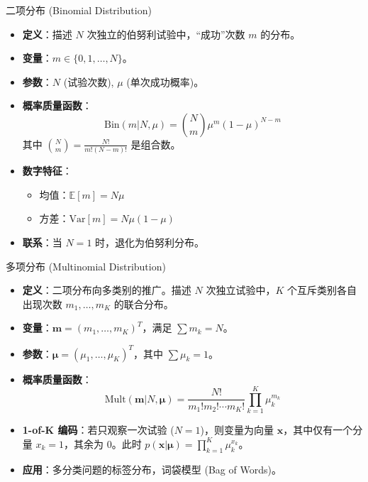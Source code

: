 \documentclass[12pt, aspectratio=169]{beamer}
\newcommand{\vect}[1]{\mathbf{#1}}
\newcommand{\E}{\mathbb{E}}
\begin{document}
\begin{frame}{二项分布 (Binomial Distribution)}
    \begin{itemize}
        \item \textbf{定义}：描述 $N$ 次独立的伯努利试验中，“成功”次数 $m$ 的分布。
        \item \textbf{变量}：$m \in \{0, 1, \dots, N\}$。
        \item \textbf{参数}：$N$ (试验次数), $\mu$ (单次成功概率)。
        \item \textbf{概率质量函数}：
        $$ \text{Bin}(m|N, \mu) = \binom{N}{m} \mu^m (1-\mu)^{N-m} $$
        其中 $\binom{N}{m} = \frac{N!}{m!(N-m)!}$ 是组合数。
        \item \textbf{数字特征}：
        \begin{itemize}
            \item 均值：$\E[m] = N\mu$
            \item 方差：$\text{Var}[m] = N\mu(1-\mu)$
        \end{itemize}
        \item \textbf{联系}：当 $N=1$ 时，退化为伯努利分布。
    \end{itemize}
\end{frame}

\begin{frame}{多项分布 (Multinomial Distribution)}
    \begin{itemize}
        \item \textbf{定义}：二项分布向多类别的推广。描述 $N$ 次独立试验中，$K$ 个互斥类别各自出现次数 $m_1, \dots, m_K$ 的联合分布。
        \item \textbf{变量}：$\vect{m} = (m_1, \dots, m_K)^T$，满足 $\sum m_k = N$。
        \item \textbf{参数}：$\boldsymbol{\mu} = (\mu_1, \dots, \mu_K)^T$，其中 $\sum \mu_k = 1$。
        \item \textbf{概率质量函数}：
        $$ \text{Mult}(\vect{m}|N, \boldsymbol{\mu}) = \frac{N!}{m_1! m_2! \cdots m_K!} \prod_{k=1}^K \mu_k^{m_k} $$
        \item \textbf{1-of-K 编码}：若只观察一次试验 ($N=1$)，则变量为向量 $\vect{x}$，其中仅有一个分量 $x_k=1$，其余为 0。此时 $p(\vect{x}|\boldsymbol{\mu}) = \prod_{k=1}^K \mu_k^{x_k}$。
        \item \textbf{应用}：多分类问题的标签分布，词袋模型 (Bag of Words)。
    \end{itemize}
\end{frame}
\end{document}
